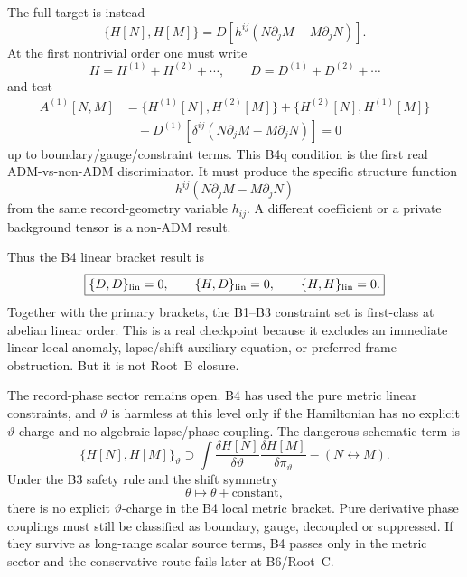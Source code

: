 \documentclass[11pt]{article}
\begin{document}
The full target is instead
\[
\boxed{
\{H[N],H[M]\}=D[h^{ij}(N\partial_jM-M\partial_jN)].
}
\]
At the first nontrivial order one must write
\[
\boxed{H=H^{(1)}+H^{(2)}+\cdots,\qquad
D=D^{(1)}+D^{(2)}+\cdots}
\]
and test
\[
\boxed{
\begin{aligned}
A^{(1)}[N,M]
&=\{H^{(1)}[N],H^{(2)}[M]\}
+\{H^{(2)}[N],H^{(1)}[M]\}\\
&\quad
-D^{(1)}[\delta^{ij}(N\partial_jM-M\partial_jN)]
=0
\end{aligned}}
\]
up to boundary/gauge/constraint terms.  This B4q condition is the first real
ADM-vs-non-ADM discriminator.  It must produce the specific structure function
\[
\boxed{h^{ij}(N\partial_jM-M\partial_jN)}
\]
from the same record-geometry variable \(h_{ij}\).  A different coefficient or
a private background tensor is a non-ADM result.

Thus the B4 linear bracket result is
\[
\boxed{
\{D,D\}_{\rm lin}=0,\qquad
\{H,D\}_{\rm lin}=0,\qquad
\{H,H\}_{\rm lin}=0.
}
\]
Together with the primary brackets, the B1--B3 constraint set is first-class
at abelian linear order.  This is a real checkpoint because it excludes an
immediate linear local anomaly, lapse/shift auxiliary equation, or
preferred-frame obstruction.  But it is not Root~B closure.

The record-phase sector remains open.  B4 has used the pure metric linear
constraints, and \(\vartheta\) is harmless at this level only if the Hamiltonian
has no explicit \(\vartheta\)-charge and no algebraic lapse/phase coupling.
The dangerous schematic term is
\[
\boxed{
\{H[N],H[M]\}_\vartheta
\supset
\int
\frac{\delta H[N]}{\delta\vartheta}
\frac{\delta H[M]}{\delta\pi_\vartheta}
-(N\leftrightarrow M).
}
\]
Under the B3 safety rule and the shift symmetry
\[
\boxed{\theta\mapsto\theta+\text{constant},}
\]
there is no explicit \(\vartheta\)-charge in the B4 local metric bracket.
Pure derivative phase couplings must still be classified as boundary, gauge,
decoupled or suppressed.  If they survive as long-range scalar source terms,
B4 passes only in the metric sector and the conservative route fails later at
B6/Root~C.
\end{document}

